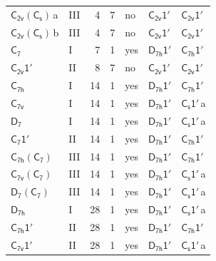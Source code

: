 \documentclass[10pt,a4paper]{article}
\numberwithin{equation}{section}
\newcommand{\grp}[1]{\mathsf{#1}}
\newcommand{\clsletter}[1]{\,{\scriptsize\color{black!55}#1}}
\begin{document}
{\begin{longtable}{@{}llrrlll@{}}
\href{C2v-C1v.pdf}{$\grp{C_{2v}}(\grp{C_{s}})$}\clsletter{a} & III & 4 & 7 & no & \href{C2v-1p.pdf}{$\grp{C_{2v}1'}$} & \href{C2v-1p.pdf}{$\grp{C_{2v}1'}$}\\
\href{C2v-C1v.pdf}{$\grp{C_{2v}}(\grp{C_{s}})$}\clsletter{b} & III & 4 & 7 & no & \href{C2v-1p.pdf}{$\grp{C_{2v}1'}$} & \href{C2v-1p.pdf}{$\grp{C_{2v}1'}$}\\
\href{../../../rotation/data/pdf/C7.pdf}{$\grp{C_{7}}$} & I & 7 & 1 & yes & \href{D7h-1p.pdf}{$\grp{D_{7h}1'}$} & \href{C7h-1p.pdf}{$\grp{C_{7h}1'}$}\\
\href{C2v-1p.pdf}{$\grp{C_{2v}1'}$} & II & 8 & 7 & no & \href{C2v-1p.pdf}{$\grp{C_{2v}1'}$} & \href{C2v-1p.pdf}{$\grp{C_{2v}1'}$}\\
\href{../../../rotation/data/pdf/C7h.pdf}{$\grp{C_{7h}}$} & I & 14 & 1 & yes & \href{D7h-1p.pdf}{$\grp{D_{7h}1'}$} & \href{C7h-1p.pdf}{$\grp{C_{7h}1'}$}\\
\href{../../../rotation/data/pdf/C7v.pdf}{$\grp{C_{7v}}$} & I & 14 & 1 & yes & \href{D7h-1p.pdf}{$\grp{D_{7h}1'}$} & \href{C1v-1p.pdf}{$\grp{C_{s}1'}$}\clsletter{a}\\
\href{../../../rotation/data/pdf/D7.pdf}{$\grp{D_{7}}$} & I & 14 & 1 & yes & \href{D7h-1p.pdf}{$\grp{D_{7h}1'}$} & \href{C1v-1p.pdf}{$\grp{C_{s}1'}$}\clsletter{a}\\
\href{C7-1p.pdf}{$\grp{C_{7}1'}$} & II & 14 & 1 & yes & \href{D7h-1p.pdf}{$\grp{D_{7h}1'}$} & \href{C7h-1p.pdf}{$\grp{C_{7h}1'}$}\\
\href{C7h-C7.pdf}{$\grp{C_{7h}}(\grp{C_{7}})$} & III & 14 & 1 & yes & \href{D7h-1p.pdf}{$\grp{D_{7h}1'}$} & \href{C7h-1p.pdf}{$\grp{C_{7h}1'}$}\\
\href{C7v-C7.pdf}{$\grp{C_{7v}}(\grp{C_{7}})$} & III & 14 & 1 & yes & \href{D7h-1p.pdf}{$\grp{D_{7h}1'}$} & \href{C1v-1p.pdf}{$\grp{C_{s}1'}$}\clsletter{a}\\
\href{D7-C7.pdf}{$\grp{D_{7}}(\grp{C_{7}})$} & III & 14 & 1 & yes & \href{D7h-1p.pdf}{$\grp{D_{7h}1'}$} & \href{C1v-1p.pdf}{$\grp{C_{s}1'}$}\clsletter{a}\\
\href{../../../rotation/data/pdf/D7h.pdf}{$\grp{D_{7h}}$} & I & 28 & 1 & yes & \href{D7h-1p.pdf}{$\grp{D_{7h}1'}$} & \href{C1v-1p.pdf}{$\grp{C_{s}1'}$}\clsletter{a}\\
\href{C7h-1p.pdf}{$\grp{C_{7h}1'}$} & II & 28 & 1 & yes & \href{D7h-1p.pdf}{$\grp{D_{7h}1'}$} & \href{C7h-1p.pdf}{$\grp{C_{7h}1'}$}\\
\href{C7v-1p.pdf}{$\grp{C_{7v}1'}$} & II & 28 & 1 & yes & \href{D7h-1p.pdf}{$\grp{D_{7h}1'}$} & \href{C1v-1p.pdf}{$\grp{C_{s}1'}$}\clsletter{a}\\

\end{longtable}}
\end{document}
